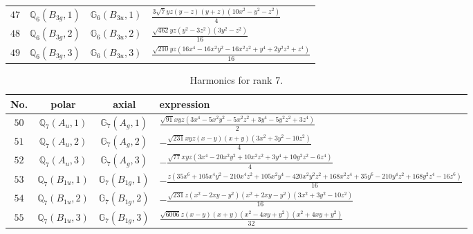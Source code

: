 \documentclass[fleqn,8pt,landscape]{jsarticle}
\begin{document}
\begin{table}[ht!]
\begin{center}
\begin{tabular}{cccl}
$ 47 $ & $ \mathbb{Q}_{6}(B_{3g},1) $ & $ \mathbb{G}_{6}(B_{3u},1) $ & $ \frac{3 \sqrt{7} y z \left(y - z\right) \left(y + z\right) \left(10 x^{2} - y^{2} - z^{2}\right)}{4} $ \\
$ 48 $ & $ \mathbb{Q}_{6}(B_{3g},2) $ & $ \mathbb{G}_{6}(B_{3u},2) $ & $ \frac{\sqrt{462} y z \left(y^{2} - 3 z^{2}\right) \left(3 y^{2} - z^{2}\right)}{16} $ \\
$ 49 $ & $ \mathbb{Q}_{6}(B_{3g},3) $ & $ \mathbb{G}_{6}(B_{3u},3) $ & $ \frac{\sqrt{210} y z \left(16 x^{4} - 16 x^{2} y^{2} - 16 x^{2} z^{2} + y^{4} + 2 y^{2} z^{2} + z^{4}\right)}{16} $ \\
 \hline \hline
\end{tabular}
\end{center}
\end{table}
\begin{table}[ht!]
\begin{center}
\caption{Harmonics for rank 7.}
\renewcommand{\arraystretch}{1.3}
\begin{tabular}{cccl} \hline \hline
No. & polar & axial & expression \\ \hline
$ 50 $ & $ \mathbb{Q}_{7}(A_{u},1) $ & $ \mathbb{G}_{7}(A_{g},1) $ & $ \frac{\sqrt{91} x y z \left(3 x^{4} - 5 x^{2} y^{2} - 5 x^{2} z^{2} + 3 y^{4} - 5 y^{2} z^{2} + 3 z^{4}\right)}{2} $ \\
$ 51 $ & $ \mathbb{Q}_{7}(A_{u},2) $ & $ \mathbb{G}_{7}(A_{g},2) $ & $ - \frac{\sqrt{231} x y z \left(x - y\right) \left(x + y\right) \left(3 x^{2} + 3 y^{2} - 10 z^{2}\right)}{4} $ \\
$ 52 $ & $ \mathbb{Q}_{7}(A_{u},3) $ & $ \mathbb{G}_{7}(A_{g},3) $ & $ - \frac{\sqrt{77} x y z \left(3 x^{4} - 20 x^{2} y^{2} + 10 x^{2} z^{2} + 3 y^{4} + 10 y^{2} z^{2} - 6 z^{4}\right)}{4} $ \\
$ 53 $ & $ \mathbb{Q}_{7}(B_{1u},1) $ & $ \mathbb{G}_{7}(B_{1g},1) $ & $ - \frac{z \left(35 x^{6} + 105 x^{4} y^{2} - 210 x^{4} z^{2} + 105 x^{2} y^{4} - 420 x^{2} y^{2} z^{2} + 168 x^{2} z^{4} + 35 y^{6} - 210 y^{4} z^{2} + 168 y^{2} z^{4} - 16 z^{6}\right)}{16} $ \\
$ 54 $ & $ \mathbb{Q}_{7}(B_{1u},2) $ & $ \mathbb{G}_{7}(B_{1g},2) $ & $ - \frac{\sqrt{231} z \left(x^{2} - 2 x y - y^{2}\right) \left(x^{2} + 2 x y - y^{2}\right) \left(3 x^{2} + 3 y^{2} - 10 z^{2}\right)}{16} $ \\
$ 55 $ & $ \mathbb{Q}_{7}(B_{1u},3) $ & $ \mathbb{G}_{7}(B_{1g},3) $ & $ \frac{\sqrt{6006} z \left(x - y\right) \left(x + y\right) \left(x^{2} - 4 x y + y^{2}\right) \left(x^{2} + 4 x y + y^{2}\right)}{32} $ \\

\end{tabular}
\end{center}
\end{table}
\end{document}

